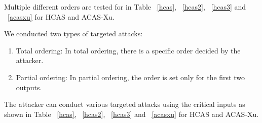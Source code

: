 Multiple different orders are tested for in Table ~\ref{hcas}, ~\ref{hcas2}, ~\ref{hcas3} and ~\ref{acasxu} for \ac{HCAS} and \ac{ACAS-Xu}. 

We conducted two types of targeted attacks:
\begin{enumerate}
\item Total ordering: In total ordering, there is a specific order decided by the attacker.
\item Partial ordering: In partial ordering, the order is set only for the first two outputs.  
\end{enumerate}

 
The attacker can conduct various targeted attacks using the critical inputs as shown in Table ~\ref{hcas}, ~\ref{hcas2}, ~\ref{hcas3} and ~\ref{acasxu} for \ac{HCAS} and \ac{ACAS-Xu}. 

